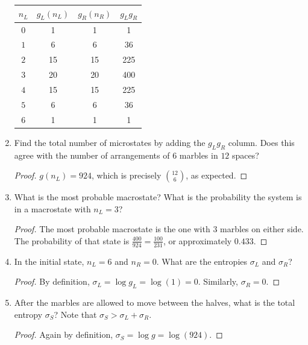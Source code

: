 \documentclass[12pt]{article}
\newenvironment{problem}[2][Problem]{\begin{trivlist}
    \item[\hskip \labelsep {\bfseries #1}\hskip \labelsep {\bfseries #2.}]}{\end{trivlist}}
\theoremstyle{definition}
\begin{document}
\begin{problem}{3}
\begin{enumerate}[label=(\alph*)]
\begin{center}
          \begin{tabular}{|c|c|c|c|}
            \hline
            \( n_{L} \) & \( g_L(n_L) \) & \( g_R(n_R) \) & \( g_Lg_R \) \\
            \hline
            \( 0 \) & 1 & 1 & 1 \\
            \hline
            \( 1 \) & 6 & 6 & 36 \\
            \hline
            \( 2 \) & 15& 15& 225\\
            \hline
            \( 3 \) & 20& 20& 400\\
            \hline
            \( 4 \) & 15& 15& 225\\
            \hline
            \( 5 \) & 6& 6& 36\\
            \hline
            \( 6 \) & 1& 1& 1\\
            \hline
          \end{tabular}
          \end{center}
    \item Find the total number of microstates by adding the \( g_Lg_R \) column.
          Does this agree with the number of arrangements of \( 6 \) marbles in \( 12 \) spaces?
          \begin{proof}
            \( g(n_{L}) = 924 \), which is precisely \( \binom{12}{6} \), as expected.
          \end{proof}
    \item What is the most probable macrostate?
          What is the probability the system is in a macrostate with \( n_L = 3 \)?
          \begin{proof}
            The most probable macrostate is the one with \( 3 \) marbles on either side.
            The probability of that state is \( \frac{400}{924} = \frac{100}{231} \), or approximately \( 0.433 \).
          \end{proof}
    \item In the initial state, \( n_L = 6 \) and \( n_R = 0 \).
          What are the entropies \( \sigma_L \) and \( \sigma_R \)?
          \begin{proof}
By definition, \(\sigma_L = \log g_L = \log(1) = 0\). Similarly, \(\sigma_R = 0\).
          \end{proof}
    \item After the marbles are allowed to move between the halves, what is the total entropy \(\sigma_S\)?
          Note that \( \sigma_S > \sigma_L + \sigma_R \).
          \begin{proof}
            Again by definition, \(\sigma_S = \log g = \log(924).\)
          \end{proof}
  \end{enumerate}
\end{problem}
\end{document}
